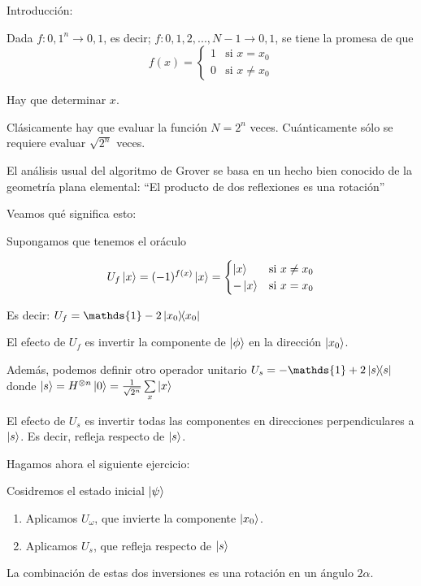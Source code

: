 \documentclass[11pt, spanish]{report}
\begin{document}
Introducción:

Dada $f:{0,1}^n \rightarrow {0,1}$, es decir; $f:{0,1,2,...,N-1} \rightarrow
{0,1}$, se tiene la promesa de que 
\[
  f(x) = 
\begin{cases}
1 & \text{si } x = x_0 \\
0 & \text{si } x \neq x_0
\end{cases}
\]

Hay que determinar $x$.

Clásicamente hay que evaluar la función $N=2^n$ veces. Cuánticamente sólo se
requiere evaluar $\sqrt{2^n}$ veces.

El análisis usual del algoritmo de Grover se basa en un hecho bien conocido de
la geometría plana elemental: ``El producto de dos reflexiones es una rotación''

Veamos qué significa esto:

Supongamos que tenemos el oráculo

\[U_f \ket{x} = (-1)^{f(x)} \ket{x} =
    \begin{cases}
      \ket{x} & \text{si } x \neq x_0 \\
      - \ket{x} & \text{si } x = x_0
    \end{cases}\]

Es decir: $U_f = \mathds{1} - 2 \ketbra{x_0}{x_0}$
  
El efecto de $U_f$ es invertir la componente de $\ket{\phi}$ en la dirección
$\ket{x_0}$.

Además, podemos definir otro operador unitario $U_s = -\mathds{1} + 2
\ketbra{s}{s}$ donde $\ket{s} = H^{\otimes n} \ket{0} = \frac{1}{\sqrt{2^n}}
\sum\limits_x \ket{x}$

El efecto de $U_s$ es invertir todas las componentes en direcciones
perpendiculares a $\ket{s}$. Es decir, refleja respecto de $\ket{s}$.

Hagamos ahora el siguiente ejercicio:

Cosidremos el estado inicial $\ket{\psi}$

\begin{enumerate}
\item Aplicamos $U_\omega$, que invierte la componente $\ket{x_0}$.
\item Aplicamos $U_s$, que refleja respecto de $\ket{s}$
\end{enumerate}

La combinación de estas dos inversiones es una rotación en un ángulo $2\alpha$.

\end{document}
